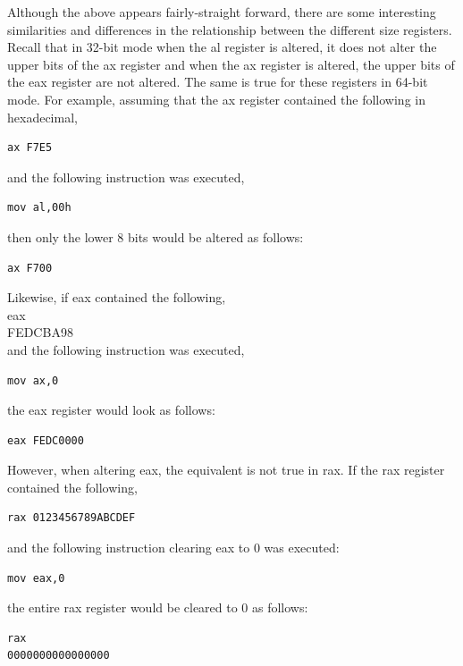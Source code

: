 \documentclass[10pt]{book}
\begin{document}
\begin{center}
\begin{center}
\begin{center}
\begin{center}
Although the above appears fairly-straight forward, there are some interesting similarities and differences in the relationship between the different size registers. Recall that in 32-bit mode when the al register is altered, it does not alter the upper bits of the ax register and when the ax register is altered, the upper bits of the eax register are not altered. The same is true for these registers in 64-bit mode. For example, assuming that the ax register contained the following in hexadecimal,

\begin{verbatim}
ax F7E5
\end{verbatim}

and the following instruction was executed,

\begin{verbatim}
mov al,00h
\end{verbatim}

then only the lower 8 bits would be altered as follows:

\begin{verbatim}
ax F700
\end{verbatim}

Likewise, if eax contained the following,\\
eax\\
FEDCBA98\\
and the following instruction was executed,

\begin{verbatim}
mov ax,0
\end{verbatim}

the eax register would look as follows:

\begin{verbatim}
eax FEDC0000
\end{verbatim}

However, when altering eax, the equivalent is not true in rax. If the rax register contained the following,

\begin{verbatim}
rax 0123456789ABCDEF
\end{verbatim}

and the following instruction clearing eax to 0 was executed:

\begin{verbatim}
mov eax,0
\end{verbatim}

the entire rax register would be cleared to 0 as follows:

\begin{verbatim}
rax
0000000000000000
\end{verbatim}


\end{center}
\end{center}
\end{center}
\end{center}
\end{document}
